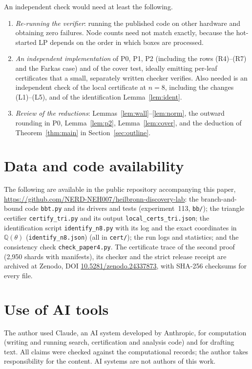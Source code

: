 \documentclass[11pt]{amsart}
\newcommand{\repourl}{\url{https://github.com/NERD-NEH007/heilbronn-discovery-lab}}
\theoremstyle{definition}
\newcommand{\Q}{\mathbb{Q}}
\begin{document}
An independent check would need at least the following.
\begin{enumerate}[label=(\roman*)]
\item \emph{Re-running the verifier}: running the published code on other hardware and obtaining zero failures. Node counts need not match exactly, because the hot-started LP depends on the order in which boxes are processed.
\item \emph{An independent implementation} of P0, P1, P2 (including the rows (R4)--(R7) and the Farkas case) and of the cover test, ideally emitting per-leaf certificates that a small, separately written checker verifies. Also needed is an independent check of the local certificate at $n = 8$, including the changes (L1)--(L5), and of the identification Lemma~\ref{lem:ident}.
\item \emph{Review of the reductions}: Lemmas~\ref{lem:wall}--\ref{lem:norm}, the outward rounding in P0, Lemma~\ref{lem:p2}, Lemma~\ref{lem:cover}, and the deduction of Theorem~\ref{thm:main} in Section~\ref{sec:outline}.
\end{enumerate}

\section*{Data and code availability}
The following are available in the public repository accompanying this paper, \repourl:
the branch-and-bound code \texttt{bbt.py} and its drivers and tests (experiment~113, \texttt{bb/}); the triangle certifier \texttt{certify\_tri.py} and its output \texttt{local\_certs\_tri.json}; the identification script \texttt{identify\_n8.py} with its log and the exact coordinates in $\Q(\theta)$ (\texttt{identify\_n8.json}) (all in \texttt{cert/}); the run logs and statistics; and the consistency check \texttt{check\_paper4.py}.
The certificate trace of the second proof (2{,}950 shards with manifests), its checker and the strict release receipt are archived at Zenodo, DOI \href{https://doi.org/10.5281/zenodo.24337873}{10.5281/zenodo.24337873}, with SHA-256 checksums for every file.

\section*{Use of AI tools}
The author used Claude, an AI system developed by Anthropic, for computation (writing and running search, certification and analysis code) and for drafting text. All claims were checked against the computational records; the author takes responsibility for the content. AI systems are not authors of this work.
\end{document}
